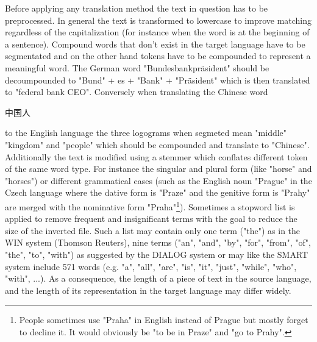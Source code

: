 \documentclass[journal]{IEEEtran}
\begin{document}
Before applying any translation method the text in question has to be preprocessed.
In general the text is transformed to lowercase to improve matching regardless of the capitalization (for instance when the word is at the beginning of a sentence).
Compound words that don't exist in the target language have to be segmentated and on the other hand tokens have to be compounded to represent a meaningful word.
The German word "Bundesbankpr\"{a}sident" should be decoumpounded to "Bund" + es + "Bank" + "Pr\"{a}sident" which is then translated to "federal bank CEO".
Conversely when translating the Chinese word \begin{CJK}{UTF8}{gbsn}中国人\end{CJK} to the English language the three logograms when segmeted mean "middle" "kingdom" and "people" which should be compounded and translate to "Chinese".\cite{ir13}
Additionally the text is modified using a stemmer which conflates different token of the same word type.
For instance the singular and plural form (like "horse" and "horses") or different grammatical cases (such as the English noun "Prague" in the Czech language where the dative form is "Praze" and the genitive form is "Prahy" are merged with the nominative form "Praha"\footnote{People sometimes use "Praha" in English instead of Prague but mostly forget to decline it.
It would obviously be "to be in Praze" and "go to Prahy".}).
Sometimes a stopword list is applied to remove frequent and insignificant terms with the goal to reduce the size of the inverted file.
Such a list may contain only one term ("the") as in the WIN system (Thomson Reuters), nine terms ("an", "and", "by", "for", "from", "of", "the", "to", "with") as suggested by the DIALOG system or may like the SMART system include 571 words (e.g. "a", "all", "are", "is", "it", "just", "while", "who", "with", ...).
As a consequence, the length of a piece of text in the source language, and the length of its representation in the target language may differ widely.
\end{document}
